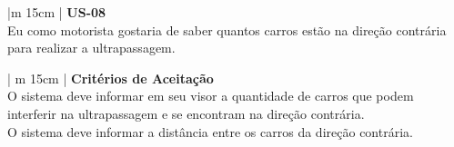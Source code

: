 \begin{table}[ht]
\caption{User Store - 08}
\centering
\begin{tabular}{|m {15cm} |}
\hline
\textbf{US-08} \\
\hline
Eu como motorista gostaria de saber quantos carros estão na direção contrária para realizar a ultrapassagem. \\
\hline
\end{tabular}
\label{table:us03}
\end{table}

\begin{table}[ht]
\caption{Critérios de Aceitaração para User Store - 08}
\centering
\begin{tabular}{| m {15cm} |}
\hline
\textbf{Critérios de Aceitação} \\
\hline
O sistema deve informar em seu visor a quantidade de carros que podem interferir na ultrapassagem e se encontram na direção contrária.\\
\hline
O sistema deve informar a distância entre os carros da direção contrária. \\
\hline
\end{tabular}
\label{table:cus01}
\end{table}
